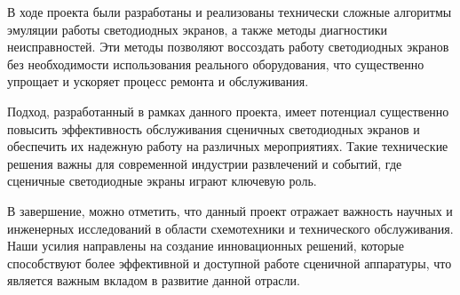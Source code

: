 \label{sec:outro}

В ходе проекта были разработаны и реализованы технически сложные алгоритмы эмуляции работы светодиодных экранов, а также методы диагностики неисправностей. Эти методы позволяют воссоздать работу светодиодных экранов без необходимости использования реального оборудования, что существенно упрощает и ускоряет процесс ремонта и обслуживания.

Подход, разработанный в рамках данного проекта, имеет потенциал существенно повысить эффективность обслуживания сценичных светодиодных экранов и обеспечить их надежную работу на различных мероприятиях. Такие технические решения важны для современной индустрии развлечений и событий, где сценичные светодиодные экраны играют ключевую роль.

В завершение, можно отметить, что данный проект отражает важность научных и инженерных исследований в области схемотехники и технического обслуживания. Наши усилия направлены на создание инновационных решений, которые способствуют более эффективной и доступной работе сценичной аппаратуры, что является важным вкладом в развитие данной отрасли.